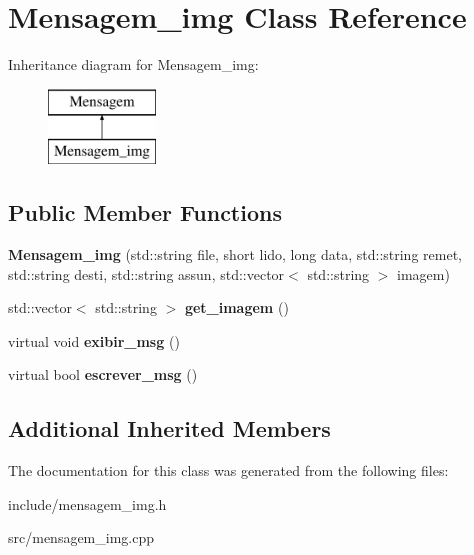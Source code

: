 \hypertarget{class_mensagem__img}{}\section{Mensagem\+\_\+img Class Reference}
\label{class_mensagem__img}
Inheritance diagram for Mensagem\+\_\+img\+:\begin{figure}[H]
\begin{center}
\leavevmode
\includegraphics[height=2.000000cm]{class_mensagem__img}
\end{center}
\end{figure}
\subsection*{Public Member Functions}
\begin{DoxyCompactItemize}
\item 
\mbox{\label{class_mensagem__img_af1e3827188dbb8393902af086c47f5ea}} 
{\bfseries Mensagem\+\_\+img} (std\+::string file, short lido, long data, std\+::string remet, std\+::string desti, std\+::string assun, std\+::vector$<$ std\+::string $>$ imagem)
\item 
\mbox{\label{class_mensagem__img_a51848dd39d6e26bf872085b5e7059343}} 
std\+::vector$<$ std\+::string $>$ {\bfseries get\+\_\+imagem} ()
\item 
\mbox{\label{class_mensagem__img_adde01f36e1e3dd8774b10bcf3a3cdd1f}} 
virtual void {\bfseries exibir\+\_\+msg} ()
\item 
\mbox{\label{class_mensagem__img_a45eea1811455d76c7ceba5efef38e2e4}} 
virtual bool {\bfseries escrever\+\_\+msg} ()
\end{DoxyCompactItemize}
\subsection*{Additional Inherited Members}


The documentation for this class was generated from the following files\+:\begin{DoxyCompactItemize}
\item 
include/mensagem\+\_\+img.\+h\item 
src/mensagem\+\_\+img.\+cpp\end{DoxyCompactItemize}
